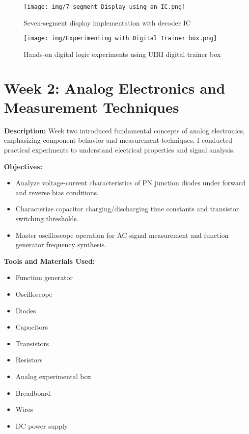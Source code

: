 \documentclass[12pt,a4paper]{report}
\begin{document}
\begin{figure}[H]
\centering
\texttt{[image: img/7 segment Display using an IC.png]}
\caption{Seven-segment display implementation with decoder IC}
\label{fig:7segment-display}
\end{figure}

\begin{figure}[H]
\centering
\texttt{[image: img/Experimenting with Digital Trainer box.png]}
\caption{Hands-on digital logic experiments using UIRI digital trainer box}
\label{fig:digital-trainer}
\end{figure}

\section{Week 2: Analog Electronics and Measurement Techniques}

\noindent\textbf{Description:} Week two introduced fundamental concepts of analog electronics, emphasizing component behavior and measurement techniques. I conducted practical experiments to understand electrical properties and signal analysis.

\noindent\textbf{Objectives:}
\begin{itemize}
    \item Analyze voltage-current characteristics of PN junction diodes under forward and reverse bias conditions.
    \item Characterize capacitor charging/discharging time constants and transistor switching thresholds.
    \item Master oscilloscope operation for AC signal measurement and function generator frequency synthesis.
\end{itemize}

\noindent\textbf{Tools and Materials Used:}
\begin{multicols}{2}
\begin{itemize}
    \item Function generator
    \item Oscilloscope
    \item Diodes
    \item Capacitors
    \item Transistors
    \item Resistors
    \item Analog experimental box
    \item Breadboard
    \item Wires
    \item DC power supply
\end{itemize}
\end{multicols}
\end{document}
